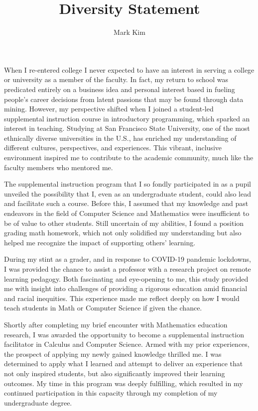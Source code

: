\documentclass[12pt]{article}
\title{Diversity Statement}
\author{Mark Kim}
\begin{document}
\maketitle

When I re-entered college I never expected to have an interest in serving a
college or university as a member of the faculty.  In fact, my return to school was
predicated entirely on a business idea and personal interest based in fueling
people's career decisions from latent passions that may be found through data
mining.  However, my perspective shifted when I joined a student-led supplemental instruction course in introductory programming, which
sparked an interest in teaching.  Studying at San Francisco State University, one of the most ethnically diverse universities in the U.S.,
has enriched my understanding of different cultures, perspectives, and experiences. This vibrant, inclusive environment inspired me to
contribute to the academic community, much like the faculty members who mentored me.

The supplemental instruction program that I so fondly participated in as a
pupil unveiled the possibility that I, even as an undergraduate student, could
also lead and facilitate such a course.  Before this, I assumed that my
knowledge and past endeavors in the field of Computer Science and Mathematics were
insufficient to be of value to other students.  Still uncertain of my abilities,
I found a position grading math homework, which not only solidified my understanding but also helped me recognize the impact of supporting
others' learning.

During my stint as a grader, and in response to COVID-19 pandemic lockdowns, I
was provided the chance to assist a professor with a research project on remote learning pedagogy.  Both fascinating and eye-opening
to me, this study provided me with insight into challenges of providing a rigorous education amid financial and racial inequities.  This
experience made me reflect deeply on how I would teach students in Math or Computer Science if given the chance.

Shortly after completing my brief encounter with Mathematics education research,
I was awarded the opportunity to become a supplemental instruction facilitator
in Calculus and Computer Science.  Armed with my prior experiences, the prospect of applying my newly
gained knowledge thrilled me.  I was determined to apply what I learned and attempt to
deliver an experience that not only inspired students, but also significantly
improved their learning outcomes.  My time in this program was deeply fulfilling, which
resulted in my continued participation in this capacity through my completion of
my undergraduate degree.
\end{document}
